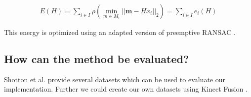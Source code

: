 \begin{eqnarray}
  E(H) = \sum_{i \in \mathit{I}}{\rho (\min_{m \in \mathit{M}_i}||\mathbf{m} -Hx_i||_2)} = \sum_{i \in \mathit{I}}{e_i(H)}
\end{eqnarray}

This energy is optimized using an adapted version of preemptive RANSAC \cite{ransac}.



\subsection{How can the method be evaluated?} %
\label{sub:how_can_the_method_be_evaluated_}

Shotton et al. \cite{shotton} provide several datasets which can be used to evaluate our implementation. Further we could create our own datasets using Kinect Fusion \cite{izadi_fusion} \cite{newcombe_fusion}.



\clearpage
\renewcommand{\leftmark}{}




%





